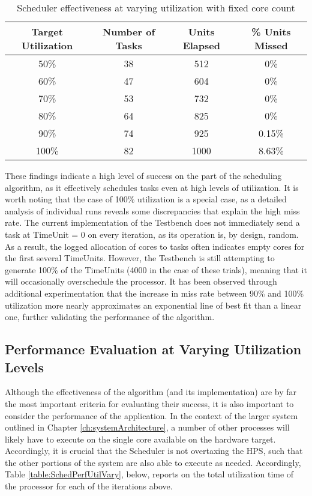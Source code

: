 \begin{table}[ht!]
    \centering\begin{tabular}{| c | c | c | c |}
        \hline
        Target Utilization & Number of Tasks & Units Elapsed & \% Units Missed \\
        \hline
        50\% & 38 & 512 & 0\% \\
        60\% & 47 & 604 & 0\% \\
        70\% & 53 & 732 & 0\% \\
        80\% & 64 & 825 & 0\% \\
        90\% & 74 & 925 & 0.15\% \\
        100\% & 82 & 1000 & 8.63\% \\
        \hline
    \end{tabular}
    \caption{Scheduler effectiveness at varying utilization with fixed core count}
    \label{table:SchedEffectivenessUtilVary}
\end{table}

These findings indicate a high level of success on the part of the scheduling algorithm, as it effectively schedules tasks even at high levels of utilization. It is worth noting that the case of 100\% utilization is a special case, as a detailed analysis of individual runs reveals some discrepancies that explain the high miss rate. The current implementation of the Testbench does not immediately send a task at TimeUnit = 0 on every iteration, as its operation is, by design, random. As a result, the logged allocation of cores to tasks often indicates empty cores for the first several TimeUnits. However, the Testbench is still attempting to generate 100\% of the TimeUnits (4000 in the case of these trials), meaning that it will occasionally overschedule the processor. It has been observed through additional experimentation that the increase in miss rate between 90\% and 100\% utilization more nearly approximates an exponential line of best fit than a linear one, further validating the performance of the algorithm.

\subsection{Performance Evaluation at Varying Utilization Levels}\label{subsec:performanceDataUtilVary}
Although the effectiveness of the algorithm (and its implementation) are by far the most important criteria for evaluating their success, it is also important to consider the performance of the application. In the context of the larger system outlined in Chapter \ref{ch:systemArchitecture}, a number of other processes will likely have to execute on the single core available on the hardware target. Accordingly, it is crucial that the Scheduler is not overtaxing the HPS, such that the other portions of the system are also able to execute as needed. Accordingly, Table \ref{table:SchedPerfUtilVary}, below, reports on the total utilization time of the processor for each of the iterations above.

